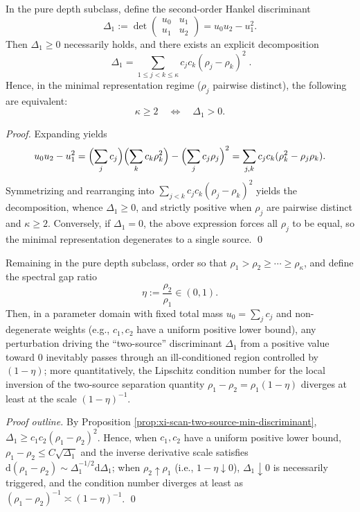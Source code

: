 \begin{proposition}[Minimal Algebraic Certificate for the Two-Source Threshold: First Discriminant for \texorpdfstring{$\kappa\ge 2$}{kappa>=2}]\label{prop:xi-scan-two-source-min-discriminant}
In the pure depth subclass, define the second-order Hankel discriminant
\[
\Delta_1
:=\det\begin{pmatrix}u_0 & u_1\\[2pt] u_1 & u_2\end{pmatrix}
=u_0u_2-u_1^2.
\]
Then \(\Delta_1\ge 0\) necessarily holds, and there exists an explicit decomposition
\[
\boxed{\;
\Delta_1=\sum_{1\le j<k\le \kappa}c_jc_k(\rho_j-\rho_k)^2\; }.
\]
Hence, in the minimal representation regime (\(\rho_j\) pairwise distinct), the following are equivalent:
\[
\boxed{\;\kappa\ge 2\quad\Longleftrightarrow\quad \Delta_1>0.\;}
\]
\end{proposition}
\begin{proof}
Expanding yields
\[
u_0u_2-u_1^2
=\Bigl(\sum_j c_j\Bigr)\Bigl(\sum_k c_k\rho_k^2\Bigr)-\Bigl(\sum_j c_j\rho_j\Bigr)^2
=\sum_{j,k}c_jc_k(\rho_k^2-\rho_j\rho_k).
\]
Symmetrizing and rearranging into \(\sum_{j<k}c_jc_k(\rho_j-\rho_k)^2\) yields the decomposition, whence \(\Delta_1\ge 0\), and strictly positive when \(\rho_j\) are pairwise distinct and \(\kappa\ge 2\).
Conversely, if \(\Delta_1=0\), the above expression forces all \(\rho_j\) to be equal, so the minimal representation degenerates to a single source. \qed
\end{proof}

\begin{proposition}\label{prop:xi-scan-two-source-stability-gap}
Remaining in the pure depth subclass, order so that \(\rho_1>\rho_2\ge\cdots\ge\rho_\kappa\), and define the spectral gap ratio
\[
\eta:=\frac{\rho_2}{\rho_1}\in(0,1).
\]
Then, in a parameter domain with fixed total mass \(u_0=\sum_j c_j\) and non-degenerate weights (e.g., \(c_1,c_2\) have a uniform positive lower bound),
any perturbation driving the ``two-source'' discriminant \(\Delta_1\) from a positive value toward \(0\) inevitably passes through an ill-conditioned region controlled by \((1-\eta)\);
more quantitatively, the Lipschitz condition number for the local inversion of the two-source separation quantity \(\rho_1-\rho_2=\rho_1(1-\eta)\) diverges at least at the scale \((1-\eta)^{-1}\).
\end{proposition}
\begin{proof}[Proof outline]
By Proposition \ref{prop:xi-scan-two-source-min-discriminant},
\(
\Delta_1\ge c_1c_2(\rho_1-\rho_2)^2
\).
Hence, when \(c_1,c_2\) have a uniform positive lower bound,
\(
\rho_1-\rho_2\le C\sqrt{\Delta_1}
\)
and the inverse derivative scale satisfies
\(
\mathrm{d}(\rho_1-\rho_2)\sim \Delta_1^{-1/2}\mathrm{d}\Delta_1
\);
when \(\rho_2\uparrow\rho_1\) (i.e., \(1-\eta\downarrow 0\)), \(\Delta_1\downarrow 0\) is necessarily triggered, and the condition number diverges at least as \((\rho_1-\rho_2)^{-1}\asymp (1-\eta)^{-1}\). \qed
\end{proof}

